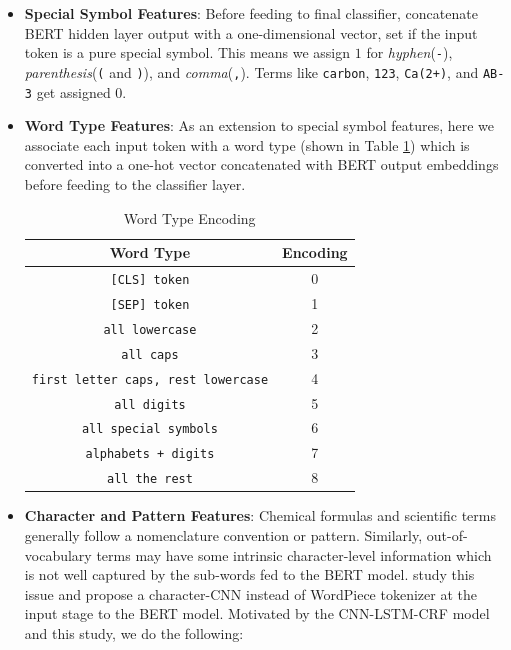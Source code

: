 \begin{itemize}
    \item \textbf{Special Symbol Features}: Before feeding to final classifier, concatenate BERT hidden layer output with a one-dimensional vector, set if the input token is a pure special symbol. This means we assign $1$ for \textit{hyphen}(\texttt{-}), \textit{parenthesis}(\texttt{(} and \texttt{)}), and \textit{comma}(\texttt{,}). Terms like \texttt{carbon}, \texttt{123}, \texttt{Ca(2+)}, and \texttt{AB-3} get assigned $0$.
    
    \item \textbf{Word Type Features}: As an extension to special symbol features, here we associate each input token with a word type (shown in Table \ref{tab:word_type_encoding}) which is converted into a one-hot vector concatenated with BERT output embeddings before feeding to the classifier layer.
    
    \begin{table}[h!]
    \centering
    \begin{tabular}{|c|c|}\hline
    	\textbf{Word Type} & \textbf{Encoding}\\\hline
    	\texttt{[CLS] token} & 0\\\hline
    	\texttt{[SEP] token} & 1\\\hline
    	\texttt{all lowercase} & 2\\\hline
    	\texttt{all caps} & 3\\\hline
    	\texttt{first letter caps, rest lowercase} & 4\\\hline
    	\texttt{all digits} & 5\\\hline
    	\texttt{all special symbols} & 6\\\hline
    	\texttt{alphabets + digits} & 7\\\hline
    	\texttt{all the rest} & 8\\\hline
    	\end{tabular}
        \caption{Word Type Encoding}
        \label{tab:word_type_encoding}
    \end{table}
    
    \item \textbf{Character and Pattern Features}: Chemical formulas and scientific terms generally follow a nomenclature convention or pattern. Similarly, out-of-vocabulary terms may have some intrinsic character-level information which is not well captured by the sub-words fed to the BERT model. \cite{boukkouri2020characterbert} study this issue and propose a character-CNN instead of WordPiece tokenizer at the input stage to the BERT model. Motivated by the CNN-LSTM-CRF\cite{ma2016end} model and this study, we do the following:
    

\end{itemize}
